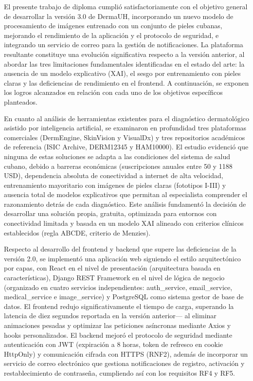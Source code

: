 \begin{conclusions}
El presente trabajo de diploma cumplió satisfactoriamente con el objetivo general de 
desarrollar la versión 3.0 de DermaUH, incorporando un nuevo modelo de procesamiento de 
imágenes entrenado con un conjunto de pieles cubanas, mejorando el rendimiento de la 
aplicación y el protocolo de seguridad, e integrando un servicio de correo para la 
gestión de notificaciones. La plataforma resultante constituye una evolución 
significativa respecto a la versión anterior, al abordar las tres limitaciones 
fundamentales identificadas en el estado del arte: la ausencia de un modelo explicativo 
(XAI), el sesgo por entrenamiento con pieles claras y las deficiencias de rendimiento en 
el frontend. A continuación, se exponen los logros alcanzados en relación con cada uno de 
los objetivos específicos planteados.

En cuanto al análisis de herramientas existentes para el diagnóstico dermatológico 
asistido por inteligencia artificial, se examinaron en profundidad tres plataformas 
comerciales (DermEngine, SkinVision y VisualDx) y tres repositorios académicos de 
referencia (ISIC Archive, DERM12345 y HAM10000). El estudio evidenció que ninguna de 
estas soluciones se adapta a las condiciones del sistema de salud cubano, debido a 
barreras económicas (suscripciones anuales entre 50 y 1188 USD), dependencia absoluta de 
conectividad a internet de alta velocidad, entrenamiento mayoritario con imágenes de 
pieles claras (fototipos I-III) y ausencia total de modelos explicativos que permitan al 
especialista comprender el razonamiento detrás de cada diagnóstico. Este análisis 
fundamentó la decisión de desarrollar una solución propia, gratuita, optimizada para 
entornos con conectividad limitada y basada en un modelo XAI alineado con criterios 
clínicos establecidos (regla ABCDE, criterio de Menzies).

Respecto al desarrollo del frontend y backend que supere las deficiencias de la versión 
2.0, se implementó una aplicación web siguiendo el estilo arquitectónico por capas, con 
React en el nivel de presentación (arquitectura basada en características), Django REST 
Framework en el nivel de lógica de negocio (organizado en cuatro servicios independientes:
auth\_service, email\_service, medical\_service e image\_service) y PostgreSQL como sistema 
gestor de base de datos. El frontend redujo significativamente el tiempo de carga, 
superando la latencia de diez segundos reportada en la versión anterior— al eliminar 
animaciones pesadas y optimizar las peticiones asíncronas mediante Axios y hooks 
personalizados. El backend mejoró el protocolo de seguridad mediante autenticación con 
JWT (expiración a 8 horas, token de refresco en cookie HttpOnly) y comunicación cifrada 
con HTTPS (RNF2), además de incorporar un servicio de correo electrónico que gestiona 
notificaciones de registro, activación y restablecimiento de contraseña, cumpliendo así 
con los requisitos RF4 y RF5.


\end{conclusions}
